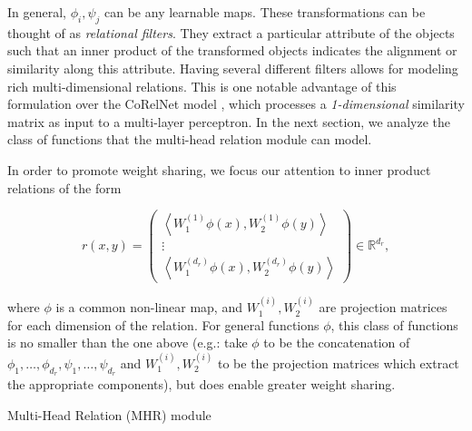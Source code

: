 In general, $\phi_i, \psi_j$ can be any learnable maps. These transformations can be thought of as \textit{relational filters}. They extract a particular attribute of the objects such that an inner product of the transformed objects indicates the alignment or similarity along this attribute. Having several different filters allows for modeling rich multi-dimensional relations. This is one notable advantage of this formulation over the CoRelNet model \citep{kerg2022neural}, which processes a \textit{1-dimensional} similarity matrix as input to a multi-layer perceptron. In the next section, we analyze the class of functions that the multi-head relation module can model.

In order to promote weight sharing, we focus our attention to inner product relations of the form

\begin{equation}\label{eq:inner_prod_rel_weight_sharing}
    r(x,y) = \begin{pmatrix} \left\langle W_1^{(1)}\phi(x), W_2^{(1)} \phi(y) \right\rangle \\  \vdots \\ \left\langle W_1^{(d_r)}\phi(x), W_2^{(d_r)} \phi(y) \right\rangle \end{pmatrix} \in \mathbb{R}^{d_r},
\end{equation}

where $\phi$ is a common non-linear map, and $W_1^{(i)}, W_2^{(i)}$ are projection matrices for each dimension of the relation. For general functions $\phi$, this class of functions is no smaller than the one above (e.g.: take $\phi$ to be the concatenation of $\phi_1, \ldots, \phi_{d_r}, \psi_1, \ldots, \psi_{d_r}$ and $W_1^{(i)}, W_2^{(i)}$ to be the projection matrices which extract the appropriate components), but does enable greater weight sharing.

\begin{algorithm}[ht!]
	\caption{Multi-Head Relation (MHR) module}\label{alg:multiheadrelation}

	\vspace{1em}

\end{algorithm}

